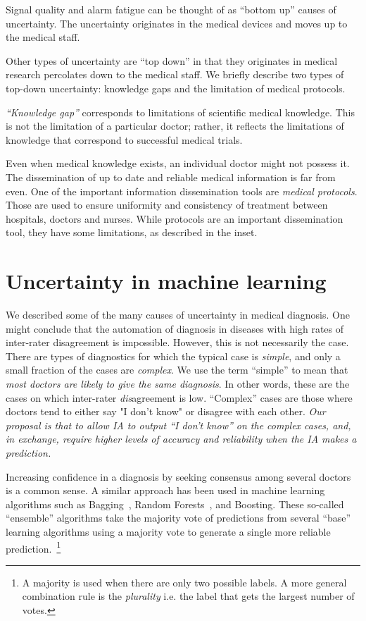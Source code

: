 \documentclass[11pt]{pnas-new}
\begin{document}
Signal quality and alarm fatigue can be thought of as ``bottom up''
causes of uncertainty. The uncertainty originates in the medical
devices and moves up to the medical staff.

Other types of uncertainty are ``top down'' in that they originates in medical research percolates down to the medical staff. We briefly
describe two types of top-down uncertainty: knowledge gaps and the
limitation of medical protocols.

{\em ``Knowledge gap''} corresponds to limitations of scientific medical
knowledge. This is not the limitation of a particular doctor; rather,
it reflects the limitations of knowledge that correspond to successful
medical trials.


Even when medical knowledge exists, an individual doctor might not
possess it. The dissemination of up to date and reliable medical
information is far from even. One of the important information
dissemination tools are {\em medical protocols}. Those are used to
ensure uniformity and consistency of treatment between hospitals,
doctors and nurses. While protocols are an important dissemination
tool, they have some limitations, as described in the inset.
~\\

\section{Uncertainty in machine learning}

We described some of the many causes of uncertainty in medical
diagnosis. One might conclude that the automation of diagnosis in
diseases with high rates of inter-rater disagreement is
impossible. However, this is not necessarily the case. There are types
of diagnostics for which the typical case is {\em simple}, and only a
small fraction of the cases are {\em complex}.  We use the term
``simple'' to mean that {\em most doctors are likely to give the same
  diagnosis}.  In other words, these are the cases on which
inter-rater {\em dis}agreement is low. ``Complex'' cases are those where
doctors tend to either say "I don't know" or disagree with each other.
{\em Our proposal is that to allow IA to output ``I don't know'' on
  the complex cases, and, in exchange, require higher levels of
  accuracy and reliability when the IA makes a prediction.}

Increasing confidence in a diagnosis by seeking consensus among
several doctors is a common sense. A similar approach has been used in
machine learning algorithms such as Bagging~\cite{breiman1996bagging},
Random Forests~\cite{breiman2001random}, and
Boosting\cite{SchapireFr2012}. These so-called ``ensemble'' algorithms
take the majority vote of predictions from several ``base'' learning
algorithms using a majority vote to generate a single more reliable
prediction.~\footnote{A majority is used when there are only two
  possible labels. A more general combination rule is the {\em
    plurality} i.e. the label that gets the largest number of votes.}
\end{document}
